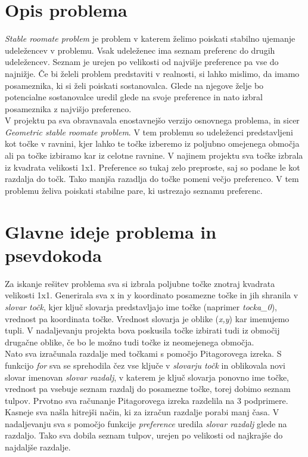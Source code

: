 \documentclass[12pt, a4paper]{article}
\begin{document}
\newpage

\section{Opis problema}
\textit{Stable roomate problem} je problem v katerem želimo poiskati stabilno ujemanje udeležencev v problemu. Vsak udeleženec ima seznam preferenc do drugih udeležencev. Seznam je urejen po velikosti od najvišje preference pa vse do najnižje. Če bi želeli problem predstaviti v realnosti, si lahko mislimo, da imamo posameznika, ki si želi poiskati sostanovalca. Glede na njegove želje bo potencialne sostanovalce uredil glede na svoje preference in nato izbral posameznika z najvišjo preferenco.\\

V projektu pa sva obravnavala enostavnejšo verzijo osnovnega problema, in sicer \textit{Geometric stable roomate problem}. V tem problemu so udeleženci predstavljeni kot točke v ravnini, kjer lahko te točke izberemo iz poljubno omejenega območja ali pa točke izbiramo kar iz celotne ravnine. V najinem projektu sva točke izbrala iz kvadrata velikosti 1x1. Preference so tukaj zelo preproste, saj so podane le kot razdalja do točk. Tako manjša razadlja do točke pomeni večjo preferenco. V tem problemu želiva poiskati stabilne pare, ki ustrezajo seznamu preferenc. \\

\pagebreak
\section{Glavne ideje problema in psevdokoda}
Za iskanje rešitev problema sva si izbrala poljubne točke znotraj kvadrata velikosti 1x1. Generirala sva x in y koordinato posamezne točke in jih shranila v \textit{slovar točk}, kjer ključ slovarja predstavljajo ime točke (naprimer \textit{tocka_0}), vrednost pa koordinata točke. Vrednost slovarja je oblike (\textit{x,y}) kar imenujemo tupli. V nadaljevanju projekta bova poskusila točke izbirati tudi iz območij drugačne oblike, če bo le možno tudi točke iz neomejenega območja.\\

Nato sva izračunala razdalje med točkami s pomočjo Pitagorovega izreka. S funkcijo \textit{for} sva se sprehodila čez vse ključe v \textit{slovarju točk} in oblikovala novi slovar imenovan \textit{slovar razdalj}, v katerem je ključ slovarja ponovno ime točke, vrednost pa vsebuje seznam razdalj do posamezne točke, torej dobimo seznam tulpov. Prvotno sva računanje Pitagorovega izreka  razdelila na 3 podprimere. Kasneje sva našla hitrejši način, ki za izračun razdalje porabi manj časa. V nadaljevanju sva s pomočjo funkcije \textit{preference} uredila \textit{slovar razdalj} glede na razdaljo. Tako sva dobila seznam tulpov, urejen po velikosti od najkrajše do najdaljše razdalje.  \\
\end{document}
